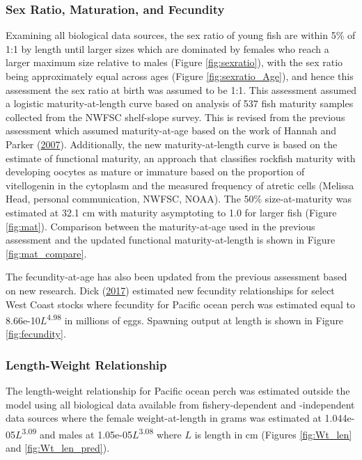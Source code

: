 \documentclass[12pt,]{article}
\begin{document}
\subsubsection{Sex Ratio, Maturation, and
Fecundity}\label{sex-ratio-maturation-and-fecundity}

Examining all biological data sources, the sex ratio of young fish are
within 5\% of 1:1 by length until larger sizes which are dominated by
females who reach a larger maximum size relative to males (Figure
\ref{fig:sexratio}), with the sex ratio being approximately equal across
ages (Figure \ref{fig:sexratio_Age}), and hence this assessment the sex
ratio at birth was assumed to be 1:1. This assessment assumed a logistic
maturity-at-length curve based on analysis of 537 fish maturity samples
collected from the NWFSC shelf-slope survey. This is revised from the
previous assessment which assumed maturity-at-age based on the work of
Hannah and Parker
(\protect\hyperlink{ref-hannah_age-modulated_2007}{2007}). Additionally,
the new maturity-at-length curve is based on the estimate of functional
maturity, an approach that classifies rockfish maturity with developing
oocytes as mature or immature based on the proportion of vitellogenin in
the cytoplasm and the measured frequency of atretic cells (Melissa Head,
personal communication, NWFSC, NOAA). The 50\% size-at-maturity was
estimated at 32.1 cm with maturity asymptoting to 1.0 for larger fish
(Figure \ref{fig:mat}). Comparison between the maturity-at-age used in
the previous assessment and the updated functional maturity-at-length is
shown in Figure \ref{fig:mat_compare}.

The fecundity-at-age has also been updated from the previous assessment
based on new research. Dick
(\protect\hyperlink{ref-dick_meta-analysis_2017}{2017}) estimated new
fecundity relationships for select West Coast stocks where fecundity for
Pacific ocean perch was estimated equal to
8.66e-10\(L\)\textsuperscript{4.98} in millions of eggs. Spawning output
at length is shown in Figure \ref{fig:fecundity}.

\subsubsection{Length-Weight
Relationship}\label{length-weight-relationship}

The length-weight relationship for Pacific ocean perch was estimated
outside the model using all biological data available from
fishery-dependent and -independent data sources where the female
weight-at-length in grams was estimated at
1.044e-05\(L\)\textsuperscript{3.09} and males at
1.05e-05\(L\)\textsuperscript{3.08} where \(L\) is length in cm (Figures
\ref{fig:Wt_len} and \ref{fig:Wt_len_pred}).
\end{document}
